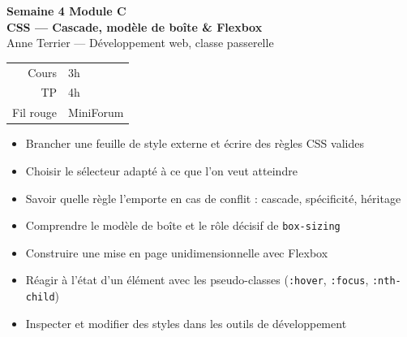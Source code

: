 \documentclass[a4paper,11pt]{article}
\begin{document}

\begin{tcolorbox}[
  colback=accentBlue, colframe=accentBlue,
  arc=4pt, left=12pt, right=12pt, top=10pt, bottom=10pt]
  \begin{minipage}{0.70\linewidth}
    {\color{cfptYellow}\Large\bfseries Semaine 4 \quad\textbar\quad Module C}\\[4pt]
    {\color{white}\Large\bfseries CSS --- Cascade, modèle de boîte \& Flexbox}\\[4pt]
    {\color{lightBlue}\normalsize Anne Terrier --- Développement web, classe passerelle}
  \end{minipage}
  \hfill
  \begin{minipage}{0.24\linewidth}
    \raggedleft
    \begin{tabular}{rl}
      \color{lightBlue}\small Cours & \color{white}\small 3h \\
      \color{lightBlue}\small TP    & \color{white}\small 4h \\
      \color{lightBlue}\small Fil rouge & \color{white}\small MiniForum \\
    \end{tabular}
  \end{minipage}
\end{tcolorbox}

\vspace{6pt}
\begin{tcolorbox}[definition, title={Objectifs de la semaine}]
\begin{itemize}
  \item Brancher une feuille de style externe et écrire des règles CSS valides
  \item Choisir le sélecteur adapté à ce que l'on veut atteindre
  \item Savoir quelle règle l'emporte en cas de conflit : cascade, spécificité, héritage
  \item Comprendre le modèle de boîte et le rôle décisif de \texttt{box-sizing}
  \item Construire une mise en page unidimensionnelle avec Flexbox
  \item Réagir à l'état d'un élément avec les pseudo-classes (\texttt{:hover}, \texttt{:focus}, \texttt{:nth-child})
  \item Inspecter et modifier des styles dans les outils de développement
\end{itemize}
\end{tcolorbox}
\end{document}
